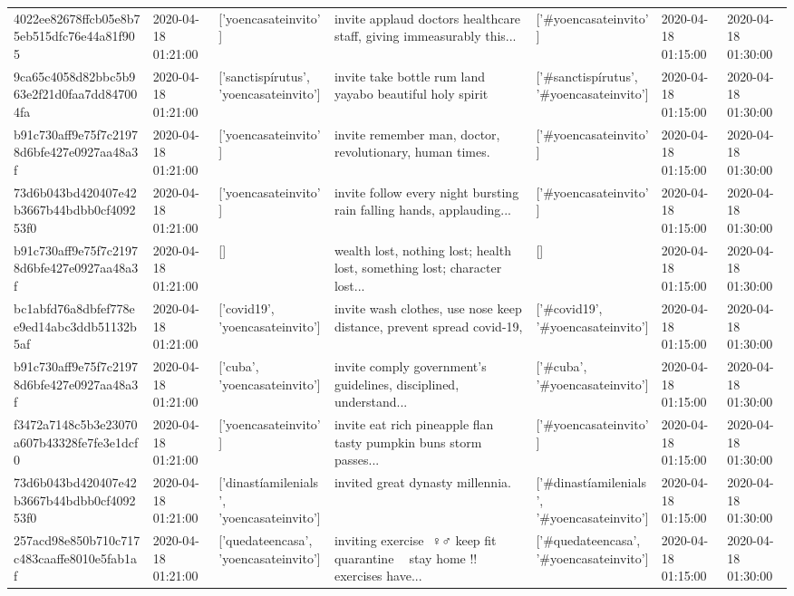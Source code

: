 \begin{tabular}{lllllll}
4022ee82678ffcb05e8b75eb515dfc76e44a81f905 & 2020-04-18 01:21:00 & ['yoencasateinvito'] & invite applaud doctors healthcare staff, giving immeasurably this... & ['#yoencasateinvito'] & 2020-04-18 01:15:00 & 2020-04-18 01:30:00 \\
9ca65c4058d82bbc5b963e2f21d0faa7dd847004fa & 2020-04-18 01:21:00 & ['sanctispírutus', 'yoencasateinvito'] & invite take bottle rum land yayabo beautiful holy spirit & ['#sanctispírutus', '#yoencasateinvito'] & 2020-04-18 01:15:00 & 2020-04-18 01:30:00 \\
b91c730aff9e75f7c21978d6bfe427e0927aa48a3f & 2020-04-18 01:21:00 & ['yoencasateinvito'] & invite remember man, doctor, revolutionary, human times. & ['#yoencasateinvito'] & 2020-04-18 01:15:00 & 2020-04-18 01:30:00 \\
73d6b043bd420407e42b3667b44bdbb0cf409253f0 & 2020-04-18 01:21:00 & ['yoencasateinvito'] & invite follow every night bursting rain falling hands, applauding... & ['#yoencasateinvito'] & 2020-04-18 01:15:00 & 2020-04-18 01:30:00 \\
b91c730aff9e75f7c21978d6bfe427e0927aa48a3f & 2020-04-18 01:21:00 & [] & wealth lost, nothing lost; health lost, something lost; character lost... & [] & 2020-04-18 01:15:00 & 2020-04-18 01:30:00 \\
bc1abfd76a8dbfef778ee9ed14abc3ddb51132b5af & 2020-04-18 01:21:00 & ['covid19', 'yoencasateinvito'] & invite wash clothes, use nose keep distance, prevent spread covid-19, & ['#covid19', '#yoencasateinvito'] & 2020-04-18 01:15:00 & 2020-04-18 01:30:00 \\
b91c730aff9e75f7c21978d6bfe427e0927aa48a3f & 2020-04-18 01:21:00 & ['cuba', 'yoencasateinvito'] & invite comply government's guidelines, disciplined, understand... & ['#cuba', '#yoencasateinvito'] & 2020-04-18 01:15:00 & 2020-04-18 01:30:00 \\
f3472a7148c5b3e23070a607b43328fe7fe3e1dcf0 & 2020-04-18 01:21:00 & ['yoencasateinvito'] & invite eat rich pineapple flan tasty pumpkin buns storm passes... & ['#yoencasateinvito'] & 2020-04-18 01:15:00 & 2020-04-18 01:30:00 \\
73d6b043bd420407e42b3667b44bdbb0cf409253f0 & 2020-04-18 01:21:00 & ['dinastíamilenials', 'yoencasateinvito'] & invited great dynasty millennia. & ['#dinastíamilenials', '#yoencasateinvito'] & 2020-04-18 01:15:00 & 2020-04-18 01:30:00 \\
257acd98e850b710c717c483caaffe8010e5fab1af & 2020-04-18 01:21:00 & ['quedateencasa', 'yoencasateinvito'] & inviting exercise ️ ♀️♂️ keep fit quarantine 💪💪 stay home !!️ exercises have... & ['#quedateencasa', '#yoencasateinvito'] & 2020-04-18 01:15:00 & 2020-04-18 01:30:00 \\

\end{tabular}

